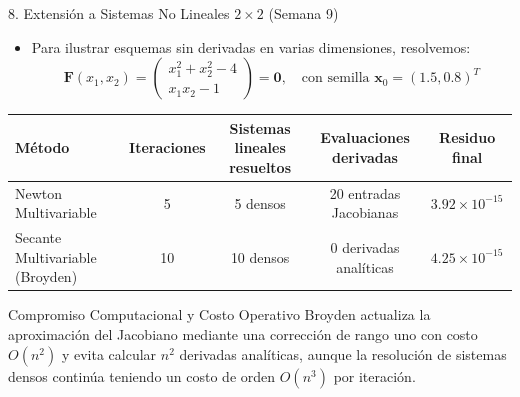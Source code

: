 \documentclass[aspectratio=169,10pt]{beamer}
\begin{document}
\begin{frame}{8. Extensión a Sistemas No Lineales $2\times 2$ (Semana 9)}
  \begin{itemize}
    \item Para ilustrar esquemas sin derivadas en varias dimensiones, resolvemos:
    $$\mathbf{F}(x_1, x_2) = \begin{pmatrix} x_1^2 + x_2^2 - 4 \\ x_1 x_2 - 1 \end{pmatrix} = \mathbf{0}, \quad \text{con semilla } \mathbf{x}_0 = (1.5, 0.8)^T$$
  \end{itemize}
  \begin{table}
    \centering\small
    \begin{tabular}{lcccc}
      \toprule
      Método & Iteraciones & Sistemas lineales resueltos & Evaluaciones derivadas & Residuo final \\
      \midrule
      Newton Multivariable & 5 & 5 densos & 20 entradas Jacobianas & $3.92\times 10^{-15}$ \\
      Secante Multivariable (Broyden) & 10 & 10 densos & 0 derivadas analíticas & $4.25\times 10^{-15}$ \\
      \bottomrule
    \end{tabular}
  \end{table}
  \begin{block}{Compromiso Computacional y Costo Operativo}
    Broyden actualiza la aproximación del Jacobiano mediante una corrección de rango uno con costo $O(n^2)$ y evita calcular $n^2$ derivadas analíticas, aunque la resolución de sistemas densos continúa teniendo un costo de orden $O(n^3)$ por iteración.
  \end{block}
\end{frame}
\end{document}
